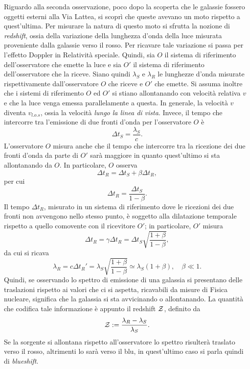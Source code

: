Riguardo alla seconda osservazione, poco dopo la scoperta che le galassie fossero oggetti esterni alla Via Lattea, si scoprì che queste avevano un moto rispetto a quest'ultima. Per misurare la natura di questo moto si sfrutta la nozione di \emph{redshift}, ossia della variazione della lunghezza d'onda della luce misurata proveniente dalla galassie verso il rosso. Per ricavare tale variazione si passa per l'effetto Doppler in Relatività speciale. Quindi, sia $O$ il sistema di riferimento dell'osservatore che emette la luce e sia $O'$ il sistema di riferimento dell'osservatore che la riceve. Siano quindi $\lambda_S$ e $\lambda_R$ le lunghezze d'onda misurate rispettivamente dall'osservatore $O$ che riceve e $O'$ che emette. Si assuma inoltre che i sistemi di riferimento $O$ ed $O'$ si stiano allontanando con velocità relativa $v$ e che la luce venga emessa parallelamente a questa. In generale, la velocità $v$ diventa $v_{l.o.s}$, ossia la velocità \emph{lungo la linea di vista}. Invece, il tempo che intercorre tra l'emissione di due fronti d'onda per l'osservatore $O$ è
\begin{equation}
    \Delta t_S = \frac{\lambda_S}{c}.
\end{equation}
L'osservatore $O$ misura anche che il tempo che intercorre tra la ricezione dei due fronti d'onda da parte di $O'$ sarà maggiore in quanto quest'ultimo si sta allontanando da $O$. In particolare, $O$ osserva
\begin{equation}
    \Delta t_R = \Delta t_S + \beta\Delta t_R,
\end{equation}
per cui 
\begin{equation}
    \Delta t_R = \frac{\Delta t_S}{1 - \beta}.
\end{equation}
Il tempo $\Delta t_R$, misurato in un sistema di riferimento dove le ricezioni dei due fronti non avvengono nello stesso punto, è soggetto alla dilatazione temporale rispetto a quello comovente con il ricevitore $O'$; in particolare, $O'$ misura
\begin{equation}
    \Delta t_R = \gamma\Delta t_R = \Delta t_S\sqrt{\frac{1 + \beta}{1 - \beta}},
\end{equation}
da cui si ricava
\begin{equation}
    \lambda_R = c\Delta t_R' = \lambda_S\sqrt{\frac{1 + \beta}{1 - \beta}} \simeq \lambda_S(1 + \beta),\quad \beta \ll 1.
\end{equation}
Quindi, se osservando lo spettro di emissione di una galassia si presentano delle traslazioni rispetto ai valori che ci si aspetta, ricavabili da misure di Fisica nucleare, significa che la galassia si sta avvicinando o allontanando. La quantità che codifica tale informazione è appunto il redshift $\mathcal{Z}$, definito da 
\begin{equation}
    \mathcal{Z} := \frac{\lambda_R - \lambda_S}{\lambda_S}.
\end{equation}
Se la sorgente si allontana rispetto all'osservatore lo spettro risulterà traslato verso il rosso, altrimenti lo sarà verso il blu, in quest'ultimo caso si parla quindi di \emph{blueshift}.

